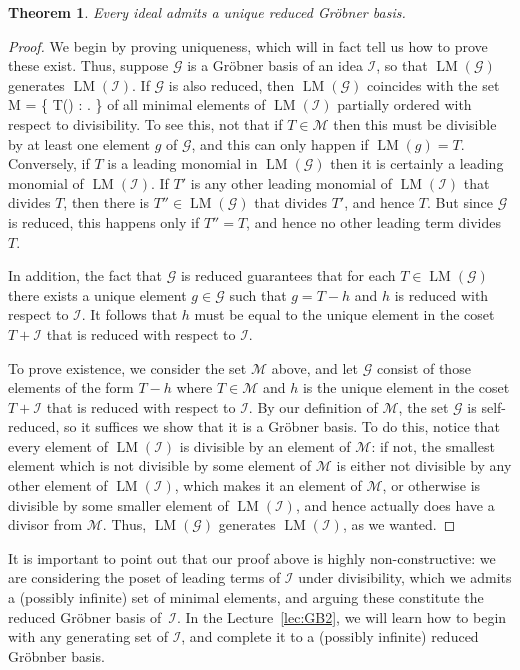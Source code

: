 \documentclass[fleqn, a4paper, twoside]{article}
\makeatletter
\newcommand{\leadm}[1]{\operatorname{LM}(#1)}
\newcommand{\0}{\langle 0\rangle}
\newcommand{\II}{\mathcal{I}}
\newcommand{\GG}{\mathcal G}
\let\[\@undefined
\DeclareRobustCommand{\[}{\begin{equation}}%
\let\]\@undefined
\DeclareRobustCommand{\]}{\end{equation}}%
\theoremstyle{mytheorem}
\newtheorem{theorem}{Theorem}[section]
\theoremstyle{introthm}
\theoremstyle{mydefinition}
\theoremstyle{mydefinition2}
\theoremstyle{plain} %
\newcommand{\?}{\,?\,}
\theoremstyle{mytheorem}
\theoremstyle{plain} %
\makeatother
\begin{document}
\begin{theorem}
Every ideal admits a unique reduced Gr\"obner basis.
\end{theorem}

\begin{proof}
We begin by proving uniqueness, which will in fact tell us
how to prove these exist. Thus, suppose $\GG$ is a 
Gr\"obner basis of an idea $\II$, so that
$\leadm{\GG}$ generates $\leadm{\II}$. If $\GG$ is
also reduced, then $\leadm{\GG}$ coincides with the set
\[ 
 \mathcal M = \{ T\in \leadm{\II} : \text{$T$ is not divisible by any
 other element of  $\leadm{\II}$}.
 	\}
	\]
of all minimal elements of $\leadm{\II}$ partially ordered
with respect to divisibility. To see this, not that if
$T\in \mathcal M$ then this must be divisible by at least
one element $g$ of $\GG$, and this can only happen 
if $\leadm{g} = T$. Conversely, if $T$ is a leading monomial
in $\leadm{\GG}$ then it is certainly a leading monomial
of $\leadm{\II}$. If $T'$ is any other
leading monomial of $\leadm{\II}$ that divides $T$, then there is
$T''\in \leadm{\GG}$ that divides $T'$, and hence $T$. But
since $\GG$ is reduced, this happens only if $T''=T$, and
hence no other leading term divides $T$.

In addition, the fact that $\GG$ is reduced guarantees
that for each $T\in\leadm{\GG}$ there exists a unique element
$g\in\GG$ such that $g= T-h$ and $h$ is reduced with
respect to $\II$. It follows that $h$ must be equal to the
unique element in the coset $T+\II$ that is reduced
with respect to $\II$.

To prove existence, we consider the set $\mathcal{M}$ above,
and let $\GG$ consist of those elements of the form $T-h$
where $T\in \mathcal{M}$ and $h$ is the unique element in
the coset $T+\II$ that is reduced with respect to $\II$. 
By our definition of $\mathcal M$, the set $\GG$ is self-reduced, 
so it suffices we show that it is a Gr\"obner basis. 
To do this, notice that every element of $\leadm{\II}$
is divisible by an element of $\mathcal M$: if not,
the smallest element which is not divisible by some
element of $\mathcal M$ is either not divisible by
any other element of $\leadm{\II}$, which makes it an element
of $\mathcal M$, or otherwise is divisible by some
smaller element of $\leadm{\II}$, and hence actually
does have a divisor from $\mathcal M$. Thus,
$\leadm{\GG}$ generates $\leadm{\II}$, as we wanted.
\end{proof}

It is important to point out that our proof above is highly
non-constructive: we are considering the poset of
leading terms of $\II$ under divisibility, 
which we admits a (possibly infinite) set of 
minimal elements, and arguing these constitute the
reduced Gr\"obner basis of~$\II$. In the Lecture~\ref{lec:GB2}, we will learn how to begin with any generating
set of $\II$, and complete it to a (possibly infinite)
reduced Gr\"obnber basis.
 
\end{document}
